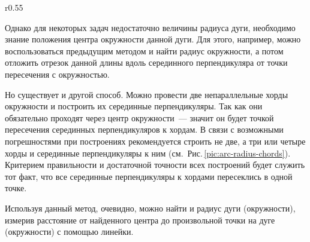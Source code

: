 \begin{wrapfigure}[15]{r}{0.55\tw}
    \centering
    \vspace{-1.5pc}
    \caption{}
    \label{pic:arc-radius-chords}
\end{wrapfigure}
Однако для некоторых задач недостаточно величины радиуса дуги, необходимо знание положения центра окружности данной дуги. Для этого, например, можно воспользоваться предыдущим методом и найти радиус окружности, а потом отложить отрезок данной длины вдоль серединного перпендикуляра от точки пересечения с окружностью.

Но существует и другой способ. Можно провести две непараллельные хорды окружности и построить их серединные перпендикуляры. Так как они обязательно проходят через центр окружности~--- значит он будет точкой пересечения серединных перпендикуляров к хордам. В связи с возможными погрешностями при построениях рекомендуется строить не две, а три или четыре хорды и серединные перпендикуляры к ним (см.~Рис.\,\ref{pic:arc-radius-chords}). Критерием правильности и достаточной точности всех построений будет служить тот факт, что все серединные перпендикуляры к хордами пересеклись в одной точке.

Используя данный метод, очевидно, можно найти и радиус дуги (окружности), измерив расстояние от найденного  центра до произвольной точки на дуге (окружности) с помощью линейки.

